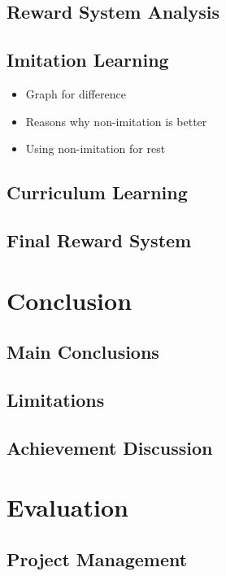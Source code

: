 \documentclass{article}
\begin{document}
\subsection{Reward System Analysis}
\lipsum[2][1]

\subsection{Imitation Learning}
\begin{itemize}
    \item Graph for difference
    \item Reasons why non-imitation is better
    \item Using non-imitation for rest
\end{itemize}

\subsection{Curriculum Learning}
\lipsum[2][1]

\subsection{Final Reward System}
\lipsum[2][1]


\section{Conclusion}
\lipsum[2][1]

\subsection{Main Conclusions}
\lipsum[2][1]

\subsection{Limitations}
\lipsum[2][1]

\subsection{Achievement Discussion}
\lipsum[2][1]


\section{Evaluation}

\subsection{Project Management}
\lipsum[2][1]
\end{document}
